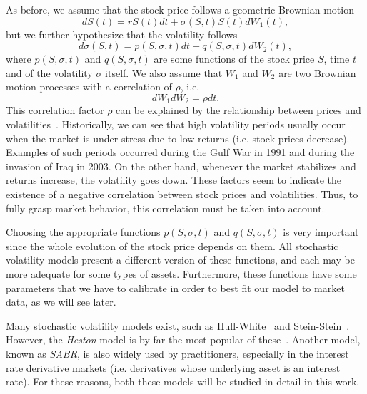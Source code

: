 As before, we assume that the stock price follows a geometric Brownian motion
\begin{equation}\label{stochvol}
dS(t)=rS(t)dt+\sigma(S,t)S(t)dW_1(t),
\end{equation}
\noindent but we further hypothesize that the volatility follows
\begin{equation}
d\sigma(S,t)=p(S,\sigma,t)dt+q(S,\sigma,t)dW_2(t),
\end{equation}
\noindent where $p(S,\sigma,t)$ and $q(S,\sigma,t)$ are some functions of the stock price $S$, time $t$ and of the volatility $\sigma$ itself. We also assume that $W_1$ and $W_2$ are two Brownian motion processes with a correlation of $\rho$, i.e.
\begin{equation}
dW_1dW_2=\rho dt.
\end{equation}
\noindent This correlation factor $\rho$ can be explained by the relationship between prices and volatilities~\cite{chourdakis}. Historically, we can see that high volatility periods usually occur when the market is under stress due to low returns (i.e. stock prices decrease). Examples of such periods occurred during the Gulf War in 1991 and during the invasion of Iraq in 2003.
On the other hand, whenever the market stabilizes and returns increase, the volatility goes down.
These factors seem to indicate the existence of a negative correlation between stock prices and volatilities. Thus, to fully grasp market behavior, this correlation must be taken into account.



Choosing the appropriate functions $p(S,\sigma,t)$ and $q(S,\sigma,t)$ is very important since the whole evolution of the stock price depends on them. All stochastic volatility models present a different version of these functions, and each may be more adequate for some types of assets. Furthermore, these functions have some parameters that we have to calibrate in order to best fit our model to market data, as we will see later.


Many stochastic volatility models exist, such as Hull-White~\cite{hullwhite} and Stein-Stein~\cite{stein}. However, the \emph{Heston} model is by far the most popular of these~\cite{chourdakis}.
Another model, known as \emph{SABR}, is also widely used by practitioners, especially in the interest rate derivative markets (i.e. derivatives whose underlying asset is an interest rate). For these reasons, both these models will be studied in detail in this work.


